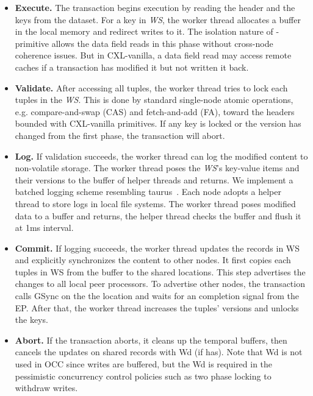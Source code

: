 \ifx\stale\undefined
\begin{itemize}
    \item \textbf{Execute. } The transaction begins execution by reading the header and the keys from the dataset. For a key in \textit{WS}, the worker thread allocates a buffer in the local memory and redirect writes to it. The isolation nature of \name-primitive allows the data field reads in this phase without cross-node coherence issues. But in CXL-vanilla, a data field read may access remote caches if a transaction has modified it but not written it back.

    \item \textbf{Validate. } After accessing all tuples, the worker thread tries to lock each tuples in the \textit{WS}. This is done by standard single-node atomic operations, e.g. compare-and-swap (CAS) and fetch-and-add (FA), toward the headers bounded with CXL-vanilla primitives. If any key is locked or the version has changed from the first phase, the transaction will abort.

    \item \textbf{Log. } If validation succeeds, the worker thread can log the modified content to non-volatile storage. The worker thread poses the \textit{WS}'s key-value items and their versions to the buffer of helper threads and returns. We implement a batched logging scheme resembling taurus~\cite{taurus_vldb2020}. Each node adopts a helper thread to store logs in local file systems. The worker thread poses modified data to a buffer and returns, the helper thread checks the buffer and flush it at 1ms interval.  

    \item \textbf{Commit. } If logging succeeds, the worker thread updates the records in WS and explicitly synchronizes the content to other nodes. It first copies each tuples in WS from the buffer to the shared locations. This step advertises the changes to all local peer processors. To advertise other nodes, the transaction calls GSync on the the location and waits for an completion signal from the EP. After that, the worker thread increases the tuples' versions and unlocks the keys. 

    \item \textbf{Abort. } If the transaction aborts, it cleans up the temporal buffers, then cancels the updates on shared records with Wd (if has). Note that Wd is not used in OCC since writes are buffered, but the Wd is required in the pessimistic concurrency control policies such as two phase locking to withdraw writes. 
\end{itemize}
\fi

